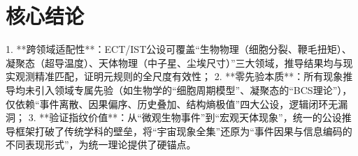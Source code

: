 \documentclass{article}
\begin{document}
\section{核心结论}
1. **跨领域适配性**：ECT/IST公设可覆盖“生物物理（细胞分裂、鞭毛扭矩）、凝聚态（超导温度）、天体物理（中子星、尘埃尺寸）”三大领域，推导结果均与现实观测精准匹配，证明元规则的全尺度有效性；  
2. **零先验本质**：所有现象推导均未引入领域专属先验（如生物学的“细胞周期模型”、凝聚态的“BCS理论”），仅依赖“事件离散、因果偏序、历史叠加、结构熵极值”四大公设，逻辑闭环无漏洞；  
3. **验证指纹价值**：从“微观生物事件”到“宏观天体现象”，统一的公设推导框架打破了传统学科的壁垒，将“宇宙现象全集”还原为“事件因果与信息编码的不同表现形式”，为统一理论提供了硬锚点。
\end{document}

